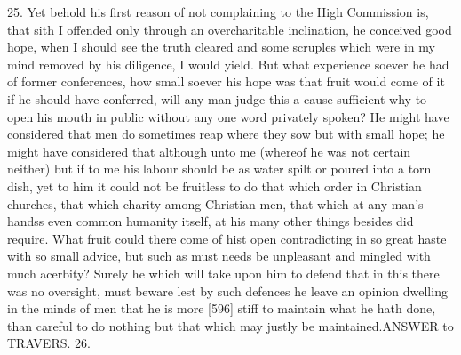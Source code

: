 25. Yet behold his first reason of not complaining to the High Commission is, that sith I offended only through an overcharitable inclination, he conceived good hope, when I should see the truth cleared and some scruples which were in my mind removed by his diligence, I would yield. But what experience soever he had of former conferences, how small soever his hope was that fruit would come of it if he should have conferred, will any man judge this a cause sufficient why to open his mouth in public without any one word privately spoken? He might have considered that men do sometimes reap where they sow but with small hope; he might have considered that although unto me (whereof he was not certain neither) but if to me his labour should be as water spilt or poured into a torn dish, yet to him it could not be fruitless to do that which order in Christian churches, that which charity among Christian men, that which at any man’s handss even common humanity itself, at his many other things besides did require. What fruit could there come of hist open contradicting in so great haste with so small advice, but such as must needs be unpleasant and mingled with much acerbity? Surely he which will take upon him to defend that in this there was no oversight, must beware lest by such defences he leave an opinion dwelling in the minds of men that he is more [596] stiff to maintain what he hath done, than careful to do nothing but that which may justly be maintained.ANSWER to TRAVERS. 26.

